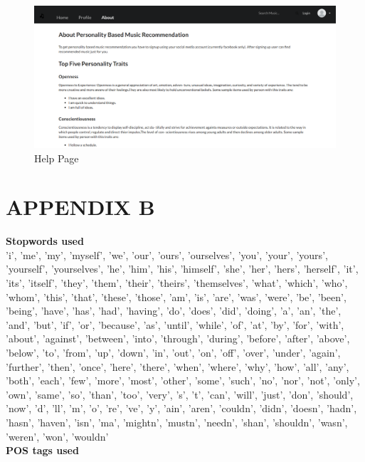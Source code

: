 \begin{figure}[!ht]
  \centering
    \includegraphics[width=1\textwidth]{fig/help_screenshot.png}
    \caption{Help Page}
\end{figure}

\cleardoublepage
\section*{APPENDIX B}
{\bf Stopwords used}\\


'i', 'me', 'my', 'myself', 'we', 'our', 'ours', 'ourselves', 'you', 'your', 'yours', 'yourself', 'yourselves', 'he', 'him', 'his', 'himself', 'she', 'her', 'hers', 'herself', 'it', 'its', 'itself', 'they', 'them', 'their', 'theirs', 'themselves', 'what', 'which', 'who', 'whom', 'this', 'that', 'these', 'those', 'am', 'is', 'are', 'was', 'were', 'be', 'been', 'being', 'have', 'has', 'had', 'having', 'do', 'does', 'did', 'doing', 'a', 'an', 'the', 'and', 'but', 'if', 'or', 'because', 'as', 'until', 'while', 'of', 'at', 'by', 'for', 'with', 'about', 'against', 'between', 'into', 'through', 'during', 'before', 'after', 'above', 'below', 'to', 'from', 'up', 'down', 'in', 'out', 'on', 'off', 'over', 'under', 'again', 'further', 'then', 'once', 'here', 'there', 'when', 'where', 'why', 'how', 'all', 'any', 'both', 'each', 'few', 'more', 'most', 'other', 'some', 'such', 'no', 'nor', 'not', 'only', 'own', 'same', 'so', 'than', 'too', 'very', 's', 't', 'can', 'will', 'just', 'don', 'should', 'now', 'd', 'll', 'm', 'o', 're', 've', 'y', 'ain', 'aren', 'couldn', 'didn', 'doesn', 'hadn', 'hasn', 'haven', 'isn', 'ma', 'mightn', 'mustn', 'needn', 'shan', 'shouldn', 'wasn', 'weren', 'won', 'wouldn'\\


{\bf POS tags used}\\


